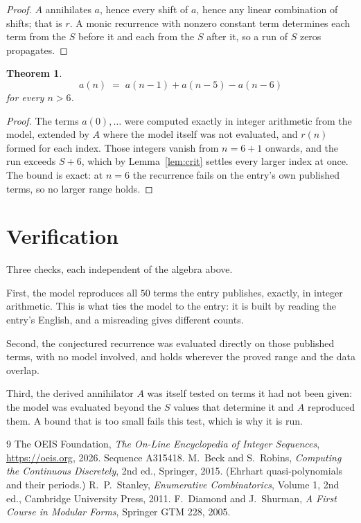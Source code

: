 \documentclass[11pt,a4paper]{article}
\theoremstyle{plain}
\newtheorem{theorem}{Theorem}
\theoremstyle{definition}
\begin{document}
\begin{proof}
$A$ annihilates $a$, hence every shift of $a$, hence any linear combination of shifts; that is
$r$. A monic recurrence with nonzero constant term determines each term from the $S$ before it
and each from the $S$ after it, so a run of $S$ zeros propagates.
\end{proof}

\begin{theorem}
\[
a(n)\;=\;a(n-1) + a(n-5) - a(n-6)
\]
for every $n>6$.
\end{theorem}

\begin{proof}
The terms $a(0),\dots$ were computed exactly in integer arithmetic from the model, extended by
$A$ where the model itself was not evaluated, and $r(n)$ formed for each index. Those integers
vanish from $n=6+1$ onwards, and the run exceeds $S+6$, which by
Lemma~\ref{lem:crit} settles every larger index at once. The bound is exact: at $n=6$ the recurrence fails on the entry's own published terms, so no larger range holds.
\end{proof}

\section{Verification}

Three checks, each independent of the algebra above.

First, the model reproduces all $50$ terms the entry publishes, exactly, in integer
arithmetic. This is what ties the model to the entry: it is built by reading the entry's
English, and a misreading gives different counts.

Second, the conjectured recurrence was evaluated directly on those published terms, with no
model involved, and holds wherever the proved range and the data overlap.

Third, the derived annihilator $A$ was itself tested on terms it had not been given: the model
was evaluated beyond the $S$ values that determine it and $A$ reproduced them. A bound that is
too small fails this test, which is why it is run.

\begin{thebibliography}{9}
 The OEIS Foundation, \emph{The On-Line Encyclopedia of Integer
Sequences}, \url{https://oeis.org}, 2026. Sequence A315418.
 M.~Beck and S.~Robins, \emph{Computing the Continuous Discretely},
2nd ed., Springer, 2015. (Ehrhart quasi-polynomials and their periods.)
 R.~P.~Stanley, \emph{Enumerative Combinatorics}, Volume 1, 2nd ed.,
Cambridge University Press, 2011.
 F.~Diamond and J.~Shurman, \emph{A First Course in Modular Forms},
Springer GTM 228, 2005.
\end{thebibliography}
\end{document}
